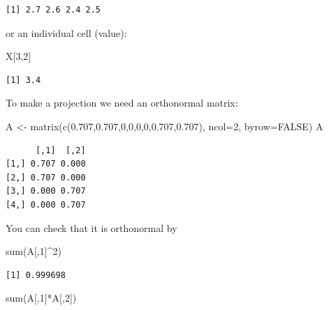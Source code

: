 \documentclass[
  letterpaper,
]{krantz}
\newenvironment{Shaded}{\begin{snugshade}}{\end{snugshade}}
\newcommand{\AttributeTok}[1]{\textcolor[rgb]{0.40,0.45,0.13}{#1}}
\newcommand{\ConstantTok}[1]{\textcolor[rgb]{0.56,0.35,0.01}{#1}}
\newcommand{\DecValTok}[1]{\textcolor[rgb]{0.68,0.00,0.00}{#1}}
\newcommand{\FloatTok}[1]{\textcolor[rgb]{0.68,0.00,0.00}{#1}}
\newcommand{\FunctionTok}[1]{\textcolor[rgb]{0.28,0.35,0.67}{#1}}
\newcommand{\NormalTok}[1]{\textcolor[rgb]{0.00,0.23,0.31}{#1}}
\newcommand{\OtherTok}[1]{\textcolor[rgb]{0.00,0.23,0.31}{#1}}
\newcommand{\SpecialCharTok}[1]{\textcolor[rgb]{0.37,0.37,0.37}{#1}}
\begin{document}
\begin{verbatim}
[1] 2.7 2.6 2.4 2.5
\end{verbatim}

or an individual cell (value):

\begin{Shaded}
\begin{Highlighting}[]
\NormalTok{X[}\DecValTok{3}\NormalTok{,}\DecValTok{2}\NormalTok{]}
\end{Highlighting}
\end{Shaded}

\begin{verbatim}
[1] 3.4
\end{verbatim}

To make a projection we need an orthonormal matrix:

\begin{Shaded}
\begin{Highlighting}[]
\NormalTok{A }\OtherTok{\textless{}{-}} \FunctionTok{matrix}\NormalTok{(}\FunctionTok{c}\NormalTok{(}\FloatTok{0.707}\NormalTok{,}\FloatTok{0.707}\NormalTok{,}\DecValTok{0}\NormalTok{,}\DecValTok{0}\NormalTok{,}\DecValTok{0}\NormalTok{,}\DecValTok{0}\NormalTok{,}\FloatTok{0.707}\NormalTok{,}\FloatTok{0.707}\NormalTok{), }\AttributeTok{ncol=}\DecValTok{2}\NormalTok{, }\AttributeTok{byrow=}\ConstantTok{FALSE}\NormalTok{)}
\NormalTok{A}
\end{Highlighting}
\end{Shaded}

\begin{verbatim}
      [,1]  [,2]
[1,] 0.707 0.000
[2,] 0.707 0.000
[3,] 0.000 0.707
[4,] 0.000 0.707
\end{verbatim}

You can check that it is orthonormal by

\begin{Shaded}
\begin{Highlighting}[]
\FunctionTok{sum}\NormalTok{(A[,}\DecValTok{1}\NormalTok{]}\SpecialCharTok{\^{}}\DecValTok{2}\NormalTok{)}
\end{Highlighting}
\end{Shaded}

\begin{verbatim}
[1] 0.999698
\end{verbatim}

\begin{Shaded}
\begin{Highlighting}[]
\FunctionTok{sum}\NormalTok{(A[,}\DecValTok{1}\NormalTok{]}\SpecialCharTok{*}\NormalTok{A[,}\DecValTok{2}\NormalTok{])}
\end{Highlighting}
\end{Shaded}
\end{document}
